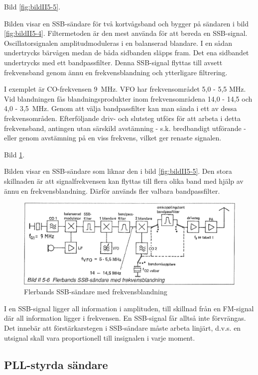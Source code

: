 Bild \ref{fig:bildII5-5}.

Bilden visar en SSB-sändare för två kortvågsband och bygger på
sändaren i bild \ref{fig:bildII5-4}.  Filtermetoden är den mest använda för att bereda
en SSB-signal. Oscillatorsignalen amplitudmoduleras i en balanserad
blandare. I en sådan undertrycks bärvågen medan de båda sidbanden
släpps fram. Det ena sidbandet undertrycks med ett
bandpassfilter. Denna SSB-signal flyttas till avsett frekvensband
genom ännu en frekvensblandning och ytterligare filtrering.

I exemplet är CO-frekvensen 9~MHz. VFO har frekvensområdet 5,0 - 5,5
MHz. Vid blandningen fås blandningsprodukter inom frekvensområdena
14,0 - 14,5 och 4,0 - 3,5~MHz. Genom att välja bandpassfilter kan man
sända i ett av dessa frekvensområden.  Efterföljande driv- och
slutsteg utförs för att arbeta i detta frekvensband, antingen utan
särskild avstämning - s.k. bredbandigt utförande - eller genom
avstämning på en viss frekvens, vilket ger renaste signalen.

Bild \ref{fig:bildII5-6}.

Bilden visar en SSB-sändare som liknar den i bild \ref{fig:bildII5-5}. Den stora
skillnaden är att signalfrekvensen kan flyttas till flera olika band
med hjälp av ännu en frekvensblandning.  Därför används fler valbara
bandpassfilter.

\begin{figure}
  \includegraphics[width=\textwidth]{images/bild_2_5-06}
  \caption{Flerbands SSB-sändare med frekvensblandning}
  \label{fig:bildII5-6}
\end{figure}

I en SSB-signal ligger all information i amplituden, till skillnad
från en FM-signal där all information ligger i frekvensen. En
SSB-signal får alltså inte förvrängas. Det innebär att
förstärkarstegen i SSB-sändare måste arbeta linjärt, d.v.s. en
utsignal skall vara proportionell till insignalen i varje moment.

\subsection{PLL-styrda sändare}

